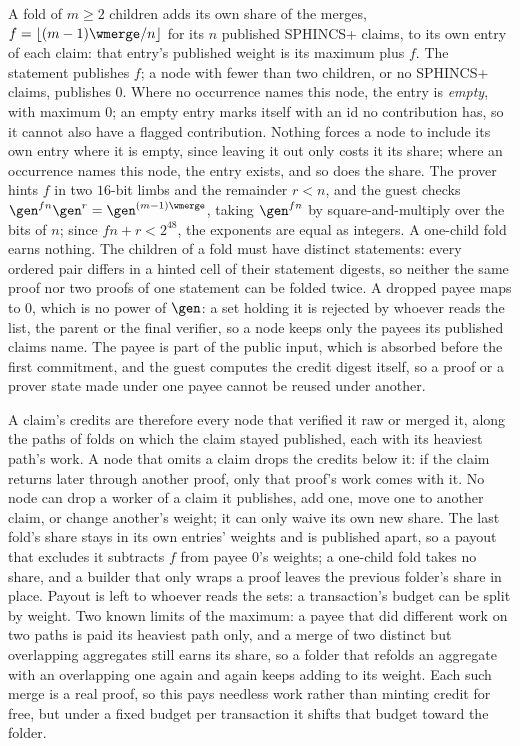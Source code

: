 A fold of $m \ge 2$ children adds its own share of the merges, $f = \lfloor (m-1) \wmerge / n \rfloor$ for its $n$ published SPHINCS+ claims, to its own entry of each claim: that entry's published weight is its maximum plus $f$. The statement publishes $f$; a node with fewer than two children, or no SPHINCS+ claims, publishes $0$. Where no occurrence names this node, the entry is \emph{empty}, with maximum $0$; an empty entry marks itself with an id no contribution has, so it cannot also have a flagged contribution. Nothing forces a node to include its own entry where it is empty, since leaving it out only costs it its share; where an occurrence names this node, the entry exists, and so does the share. The prover hints $f$ in two $16$-bit limbs and the remainder $r < n$, and the guest checks $\gen^{fn}\gen^r = \gen^{(m-1)\wmerge}$, taking $\gen^{fn}$ by square-and-multiply over the bits of $n$; since $fn + r < 2^{48}$, the exponents are equal as integers. A one-child fold earns nothing. The children of a fold must have distinct statements: every ordered pair differs in a hinted cell of their statement digests, so neither the same proof nor two proofs of one statement can be folded twice. A dropped payee maps to $0$, which is no power of $\gen$: a set holding it is rejected by whoever reads the list, the parent or the final verifier, so a node keeps only the payees its published claims name. The payee is part of the public input, which is absorbed before the first commitment, and the guest computes the credit digest itself, so a proof or a prover state made under one payee cannot be reused under another.

A claim's credits are therefore every node that verified it raw or merged it, along the paths of folds on which the claim stayed published, each with its heaviest path's work. A node that omits a claim drops the credits below it: if the claim returns later through another proof, only that proof's work comes with it. No node can drop a worker of a claim it publishes, add one, move one to another claim, or change another's weight; it can only waive its own new share. The last fold's share stays in its own entries' weights and is published apart, so a payout that excludes it subtracts $f$ from payee $0$'s weights; a one-child fold takes no share, and a builder that only wraps a proof leaves the previous folder's share in place. Payout is left to whoever reads the sets: a transaction's budget can be split by weight. Two known limits of the maximum: a payee that did different work on two paths is paid its heaviest path only, and a merge of two distinct but overlapping aggregates still earns its share, so a folder that refolds an aggregate with an overlapping one again and again keeps adding to its weight. Each such merge is a real proof, so this pays needless work rather than minting credit for free, but under a fixed budget per transaction it shifts that budget toward the folder.


